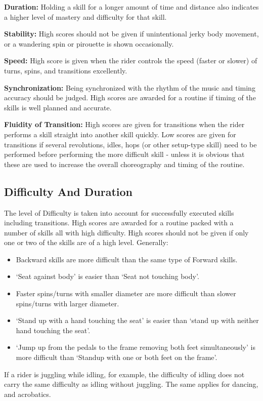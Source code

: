 \textbf{Duration:} Holding a skill for a longer amount of time and distance also indicates a higher level of mastery and difficulty for that skill.

\textbf{Stability:} High scores should not be given if unintentional jerky body movement, or a wandering spin or pirouette is shown occasionally.

\textbf{Speed:} High score is given when the rider controls the speed (faster or slower) of turns, spins, and transitions excellently.

\textbf{Synchronization:} Being synchronized with the rhythm of the music and timing accuracy should be judged.
High scores are awarded for a routine if timing of the skills is well planned and accurate.

\textbf{Fluidity of Transition:} High scores are given for transitions when the rider performs a skill straight into another skill quickly.
Low scores are given for transitions if several revolutions, idles, hops (or other setup-type skill) need to be performed before performing the more difficult skill - unless it is obvious that these are used to increase the overall choreography and timing of the routine.

\subsection{Difficulty And Duration}
The level of Difficulty is taken into account for successfully executed skills including transitions.
High scores are awarded for a routine packed with a number of skills all with high difficulty.
High scores should not be given if only one or two of the skills are of a high level.
Generally:
\begin{itemize} 
\item Backward skills are more difficult than the same type of Forward skills.
\item `Seat against body' is easier than `Seat not touching body'.
\item Faster spins/turns with smaller diameter are more difficult than slower spins/turns with larger diameter.
\item `Stand up with a hand touching the seat' is easier than `stand up with neither hand touching the seat'.
\item `Jump up from the pedals to the frame removing both feet simultaneously' is more difficult than `Standup with one or both feet on the frame'.
\end{itemize}
If a rider is juggling while idling, for example, the difficulty of idling does not carry the same difficulty as idling without juggling.
The same applies for dancing, and acrobatics.

